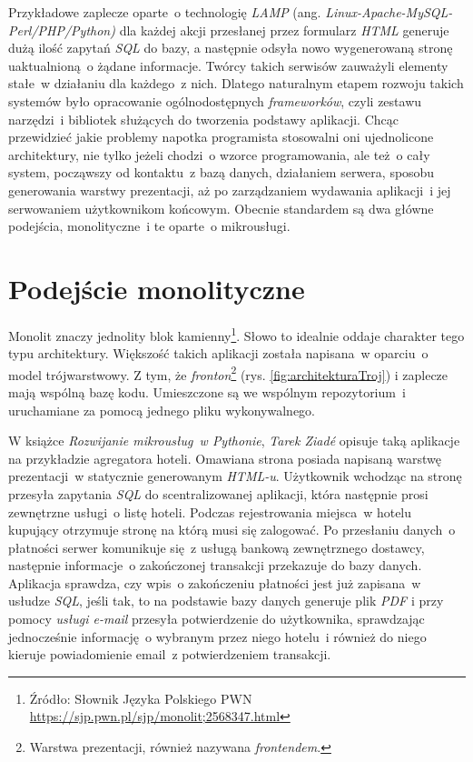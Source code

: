 Przykładowe zaplecze oparte~o technologię \textit{LAMP} (ang. \textit{Linux-Apache-MySQL-Perl/PHP/Python)}\cite{Ziade:2018} dla każdej akcji przesłanej przez formularz \textit{HTML} generuje dużą ilość zapytań \textit{SQL} do bazy, a następnie odsyła nowo wygenerowaną stronę uaktualnioną~o żądane informacje\cite{Wilton:2005}. Twórcy takich serwisów zauważyli elementy stałe~w działaniu dla każdego~z nich. Dlatego naturalnym etapem rozwoju takich systemów było opracowanie ogólnodostępnych \textit{frameworków}, czyli zestawu narzędzi~i bibliotek służących do tworzenia podstawy aplikacji. Chcąc przewidzieć jakie problemy napotka programista stosowalni oni ujednolicone architektury, nie tylko jeżeli chodzi~o wzorce programowania, ale też~o cały system, począwszy od kontaktu~z bazą danych, działaniem serwera, sposobu generowania warstwy prezentacji, aż po zarządzaniem wydawania aplikacji~i jej serwowaniem użytkownikom końcowym. Obecnie standardem są dwa główne podejścia, monolityczne~i te oparte~o mikrousługi.

\section{Podejście monolityczne}
Monolit znaczy jednolity blok kamienny\footnote{Źródło: Słownik Języka Polskiego PWN \url{https://sjp.pwn.pl/sjp/monolit;2568347.html}}. Słowo to idealnie oddaje charakter tego typu architektury. Większość takich aplikacji została napisana~w oparciu~o model trójwarstwowy. Z tym, że \textit{fronton}\footnote{Warstwa prezentacji, również nazywana \textit{frontendem}.} (rys. \ref{fig:architekturaTroj}) i zaplecze mają wspólną bazę kodu. Umieszczone są we wspólnym repozytorium~i uruchamiane za pomocą jednego pliku wykonywalnego\cite{Folwer:2019}.

W książce \textit{Rozwijanie mikrousług~w Pythonie}, \textit{Tarek Ziadé} opisuje taką aplikacje na przykładzie agregatora hoteli\cite{Ziade:2018}. Omawiana strona posiada napisaną warstwę prezentacji~w statycznie generowanym \textit{HTML-u}. Użytkownik wchodząc na stronę przesyła zapytania \textit{SQL} do scentralizowanej aplikacji, która następnie prosi zewnętrzne usługi~o listę hoteli. Podczas rejestrowania miejsca~w hotelu kupujący otrzymuje stronę na którą musi się zalogować. Po przesłaniu danych~o płatności serwer komunikuje się~z usługą bankową zewnętrznego dostawcy, następnie informacje~o zakończonej transakcji przekazuje do bazy danych. Aplikacja sprawdza, czy wpis~o zakończeniu płatności jest już zapisana~w usłudze \textit{SQL}, jeśli tak, to na podstawie bazy danych generuje plik \textit{PDF} i przy pomocy \textit{usługi e-mail} przesyła potwierdzenie do użytkownika, sprawdzając jednocześnie informację~o wybranym przez niego hotelu~i również do niego kieruje powiadomienie email~z potwierdzeniem transakcji.

